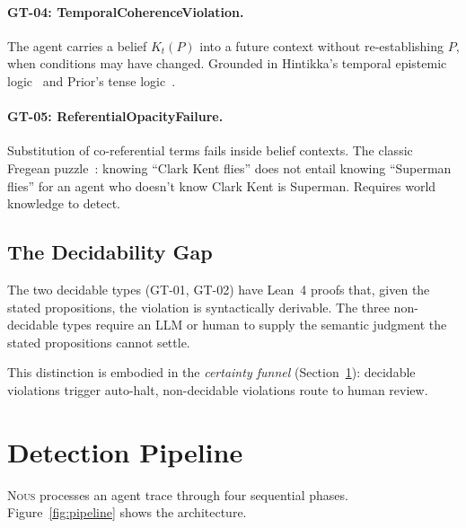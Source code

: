 \documentclass[11pt]{article}
\newcommand{\nous}{\textsc{Nous}} %
\begin{document}
\paragraph{GT-04: TemporalCoherenceViolation.}
The agent carries a belief $K_t(P)$ into a future context without
re-establishing $P$, when conditions may have changed. Grounded in
Hintikka's temporal epistemic logic~\citep{hintikka1962} and Prior's tense
logic~\citep{prior1967}.

\paragraph{GT-05: ReferentialOpacityFailure.}
Substitution of co-referential terms fails inside belief contexts. The
classic Fregean puzzle~\citep{frege1892}: knowing ``Clark Kent flies''
does not entail knowing ``Superman flies'' for an agent who doesn't know
Clark Kent is Superman. Requires world knowledge to detect.

\subsection{The Decidability Gap}
\label{sec:decidability}

The two decidable types (GT-01, GT-02) have Lean~4 proofs that, given
the stated propositions, the violation is syntactically derivable. The
three non-decidable types require an LLM or human to supply the semantic
judgment the stated propositions cannot settle.

This distinction is embodied in the \emph{certainty funnel}
(Section~\ref{sec:pipeline}): decidable violations trigger auto-halt,
non-decidable violations route to human review.

\section{Detection Pipeline}
\label{sec:pipeline}

\nous{} processes an agent trace through four sequential phases.
Figure~\ref{fig:pipeline} shows the architecture.
\end{document}
